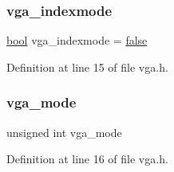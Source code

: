 \subsubsection{\texorpdfstring{vga\+\_\+indexmode}{vga\_indexmode}}
{\footnotesize\ttfamily \hyperlink{a00038_af6a258d8f3ee5206d682d799316314b1_af6a258d8f3ee5206d682d799316314b1}{bool} vga\+\_\+indexmode = \hyperlink{a00038_af6a258d8f3ee5206d682d799316314b1_af6a258d8f3ee5206d682d799316314b1ae9de385ef6fe9bf3360d1038396b884c}{false}}



Definition at line 15 of file vga.\+h.

\mbox{\label{a00008_ab1902955c9a6467e453b0e28f3c2d247_ab1902955c9a6467e453b0e28f3c2d247}} 
\subsubsection{\texorpdfstring{vga\+\_\+mode}{vga\_mode}}
{\footnotesize\ttfamily unsigned int vga\+\_\+mode}



Definition at line 16 of file vga.\+h.

